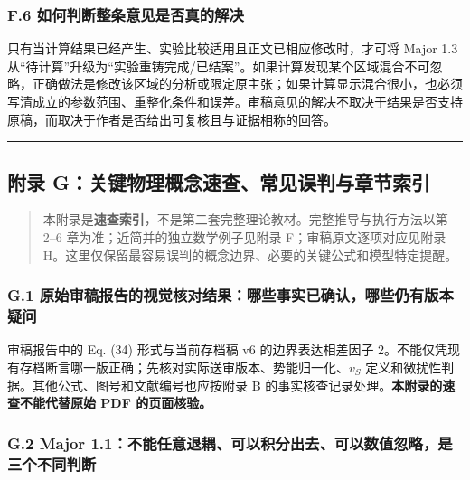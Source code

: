 \documentclass[
]{article}
\begin{document}
\subsubsection{F.6
如何判断整条意见是否真的解决}\label{f.6-ux5982ux4f55ux5224ux65adux6574ux6761ux610fux89c1ux662fux5426ux771fux7684ux89e3ux51b3}

只有当计算结果已经产生、实验比较适用且正文已相应修改时，才可将 Major 1.3
从``待计算''升级为``实验重铸完成/已结案''。如果计算发现某个区域混合不可忽略，正确做法是修改该区域的分析或限定原主张；如果计算显示混合很小，也必须写清成立的参数范围、重整化条件和误差。审稿意见的解决不取决于结果是否支持原稿，而取决于作者是否给出可复核且与证据相称的回答。

\begin{center}\rule{0.5\linewidth}{0.5pt}\end{center}

\subsection{附录
G：关键物理概念速查、常见误判与章节索引}\label{ux9644ux5f55-gux5173ux952eux7269ux7406ux6982ux5ff5ux901fux67e5ux5e38ux89c1ux8befux5224ux4e0eux7ae0ux8282ux7d22ux5f15}

\begin{quote}
本附录是\textbf{速查索引}，不是第二套完整理论教材。完整推导与执行方法以第
2--6 章为准；近简并的独立数学例子见附录 F；审稿原文逐项对应见附录
H。这里仅保留最容易误判的概念边界、必要的关键公式和模型特定提醒。
\end{quote}

\subsubsection{G.1
原始审稿报告的视觉核对结果：哪些事实已确认，哪些仍有版本疑问}\label{g.1-ux539fux59cbux5ba1ux7a3fux62a5ux544aux7684ux89c6ux89c9ux6838ux5bf9ux7ed3ux679cux54eaux4e9bux4e8bux5b9eux5df2ux786eux8ba4ux54eaux4e9bux4ecdux6709ux7248ux672cux7591ux95ee}

审稿报告中的 Eq. (34) 形式与当前存档稿 v6 的边界表达相差因子
2。不能仅凭现有存档断言哪一版正确；先核对实际送审版本、势能归一化、\(v_S\)
定义和微扰性判据。其他公式、图号和文献编号也应按附录 B
的事实核查记录处理。\textbf{本附录的速查不能代替原始 PDF 的页面核验。}

\subsubsection{G.2 Major
1.1：不能任意退耦、可以积分出去、可以数值忽略，是三个不同判断}\label{g.2-major-1.1ux4e0dux80fdux4efbux610fux9000ux8026ux53efux4ee5ux79efux5206ux51faux53bbux53efux4ee5ux6570ux503cux5ffdux7565ux662fux4e09ux4e2aux4e0dux540cux5224ux65ad}
\end{document}
